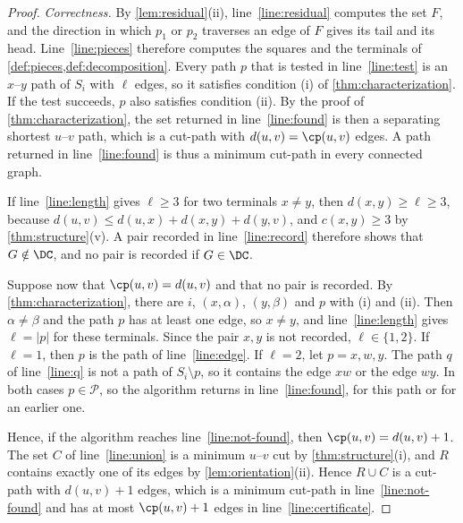 \begin{proof}
\emph{Correctness.}
By \cref{lem:residual}(ii), line~\ref{line:residual} computes the set $F$, and the direction in which $p_1$ or $p_2$ traverses an edge of $F$ gives its tail and its head.
Line~\ref{line:pieces} therefore computes the squares and the terminals of \cref{def:pieces,def:decomposition}.
Every path $p$ that is tested in line~\ref{line:test} is an $x$--$y$ path of $S_i$ with $\ell$ edges, so it satisfies condition (i) of \cref{thm:characterization}.
If the test succeeds, $p$ also satisfies condition (ii).
By the proof of \cref{thm:characterization}, the set returned in line~\ref{line:found} is then a separating shortest $u$--$v$ path, which is a cut-path with $d(u, v) = \cp(u, v)$ edges.
A path returned in line~\ref{line:found} is thus a minimum cut-path in every connected graph.

If line~\ref{line:length} gives $\ell \geq 3$ for two terminals $x \neq y$, then $d(x, y) \geq \ell \geq 3$, because $d(u, v) \leq d(u, x) + d(x, y) + d(y, v)$, and $c(x, y) \geq 3$ by \cref{thm:structure}(v).
A pair recorded in line~\ref{line:record} therefore shows that $G \notin \DC$, and no pair is recorded if $G \in \DC$.

Suppose now that $\cp(u, v) = d(u, v)$ and that no pair is recorded.
By \cref{thm:characterization}, there are $i$, $(x, \alpha)$, $(y, \beta)$ and $p$ with (i) and (ii).
Then $\alpha \neq \beta$ and the path $p$ has at least one edge, so $x \neq y$, and line~\ref{line:length} gives $\ell = |p|$ for these terminals.
Since the pair $x, y$ is not recorded, $\ell \in \{1, 2\}$.
If $\ell = 1$, then $p$ is the path of line~\ref{line:edge}.
If $\ell = 2$, let $p = x, w, y$.
The path $q$ of line~\ref{line:q} is not a path of $S_i \setminus p$, so it contains the edge $xw$ or the edge $wy$.
In both cases $p \in \mathcal{P}$, so the algorithm returns in line~\ref{line:found}, for this path or for an earlier one.

Hence, if the algorithm reaches line~\ref{line:not-found}, then $\cp(u, v) = d(u, v) + 1$.
The set $C$ of line~\ref{line:union} is a minimum $u$--$v$ cut by \cref{thm:structure}(i), and $R$ contains exactly one of its edges by \cref{lem:orientation}(ii).
Hence $R \cup C$ is a cut-path with $d(u, v) + 1$ edges, which is a minimum cut-path in line~\ref{line:not-found} and has at most $\cp(u, v) + 1$ edges in line~\ref{line:certificate}.


\end{proof}
